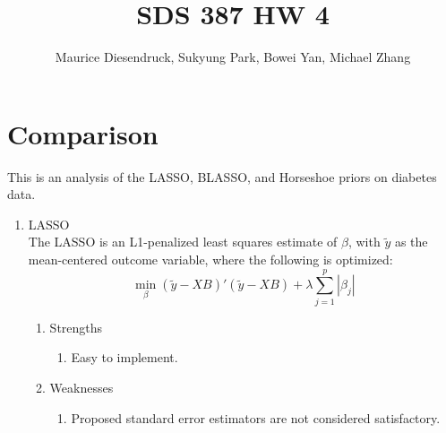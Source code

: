 \documentclass[11pt,letterpaper]{article}
\author{Maurice Diesendruck, Sukyung Park, Bowei Yan, Michael Zhang}
\title{SDS 387 HW 4}
\begin{document}

\maketitle
\setcounter{section}{2}

\section{Comparison}
This is an analysis of the LASSO, BLASSO, and Horseshoe priors on diabetes data.
  \begin{enumerate}    
      \item LASSO \\
      The LASSO is an L1-penalized least squares estimate of $\beta$, with $\tilde{y}$
      as the mean-centered outcome variable, where the following is optimized:\\
      $$\min_{\beta} (\tilde{y} - XB)'(\tilde{y} - XB) + 
        \lambda\sum\limits_{j=1}^p |\beta_{j}|$$
      \begin{enumerate}
        \item Strengths
              \begin{enumerate}
                \item Easy to implement.
              \end{enumerate}
        \item Weaknesses
              \begin{enumerate}
                \item Proposed standard error estimators are not considered satisfactory.
              \end{enumerate}
      \end{enumerate}
      

\end{enumerate}
\end{document}
